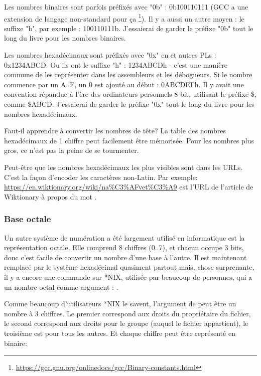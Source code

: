 Les nombres binaires sont parfois préfixés avec "0b" : 0b100110111 (\ac{GCC} a une
extension de langage non-standard pour ça
\footnote{\url{https://gcc.gnu.org/onlinedocs/gcc/Binary-constants.html}}). Il y a
aussi un autre moyen : le suffixe "b", par exemple : 100110111b. J'essaierai de
garder le préfixe "0b" tout le long du livre pour les nombres binaires.

Les nombres hexadécimaux sont préfixés avec "0x" en \CCpp et autres \ac{PL}s :
0x1234ABCD. Ou ils ont le suffixe "h" : 1234ABCDh - c'est une manière commune de les
représenter dans les assembleurs et les débogueurs. Si le nombre commence par un
A..F, un 0 est ajouté au début : 0ABCDEFh. Il y avait une convention répandue à
l'ère des ordinateurs personnels 8-bit, utilisant le préfixe \$, comme \$ABCD.
J'essaierai de garder le préfixe "0x" tout le long du livre pour les nombres
hexadécimaux.

Faut-il apprendre à convertir les nombres de tête? La table des nombres hexadécimaux
de 1 chiffre peut facilement être mémorisée. Pour les nombres plus gros, ce n'est pas
la peine de se tourmenter.

Peut-être que les nombres hexadécimaux les plus visibles sont dans les \ac{URL}s.
C'est la façon d'encoder les caractères non-Latin.
Par exemple:
\url{https://en.wiktionary.org/wiki/na\%C3\%AFvet\%C3\%A9} est l'\ac{URL} de l'article
de Wiktionary à propos du mot .

\subsubsection{Base octale}

Un autre système de numération a été largement utilisé en informatique est la
représentation octale. Elle comprend 8 chiffres (0..7), et chacun occupe 3 bits,
donc c'est facile de convertir un nombre d'une base à l'autre. Il est maintenant
remplacé par le système hexadécimal quasiment partout mais, chose surprenante, il
y a encore une commande sur *NIX, utilisée par beaucoup de personnes, qui a un nombre
octal comme argument : .

Comme beaucoup d'utilisateurs *NIX le savent, l'argument de
 peut être un nombre à 3 chiffres. Le premier correspond aux droits du
propriétaire du fichier, le second correspond aux droits pour le groupe (auquel le
fichier appartient), le troisième est pour tous les autres. Et chaque chiffre peut
être représenté en binaire:

